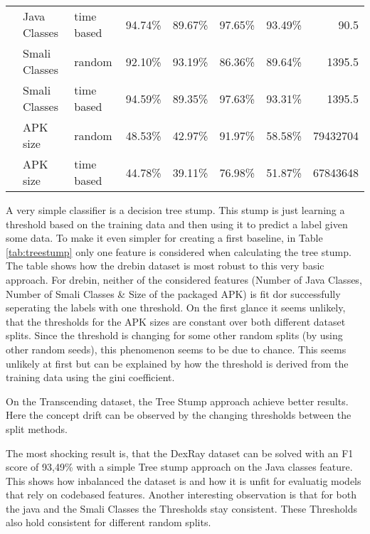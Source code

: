 \begin{table*}[t!]
{\begin{tabularx}{\linewidth}{@{}l l l r r r r r@{}}
                   & Java Classes & time based & 94.74\% & 89.67\% & 97.65\% & 93.49\% & 90.5 \\
                   & Smali Classes & random    & 92.10\% & 93.19\% & 86.36\% & 89.64\% & 1395.5 \\
                   & Smali Classes & time based & 94.59\% & 89.35\% & 97.63\% & 93.31\% & 1395.5 \\
                   & APK size     & random     & 48.53\% & 42.97\% & 91.97\% & 58.58\% & 79432704 \\
                   & APK size & time based & 44.78\% & 39.11\% & 76.98\% & 51.87\% & 67843648 \\
            \bottomrule
        \end{tabularx}
    }
\end{table*}

A very simple classifier is a decision tree stump.
This stump is just learning a threshold based on the training data and then using it to predict a label given some data.
To make it even simpler for creating a first baseline, in Table \ref{tab:treestump} only one feature is considered when calculating the tree stump.
The table shows how the drebin dataset is most robust to this very basic approach.
For drebin, neither of the considered features (Number of Java Classes, Number of Smali Classes \& Size of the packaged APK)
is fit dor successfully seperating the labels with one threshold.
On the first glance it seems unlikely, that the thresholds for the APK sizes are constant over both different dataset splits.
Since the threshold is changing for some other random splits (by using other random seeds),
this phenomenon seems to be due to chance.
This seems unlikely at first but can be explained by how the threshold is derived from the training data
using the gini coefficient.

On the Transcending dataset, the Tree Stump approach achieve better results.
Here the concept drift can be observed by the changing thresholds between the split methods.

The most shocking result is, that the DexRay dataset can be solved with an F1 score of 93,49\% 
with a simple Tree stump approach on the Java classes feature.
This shows how inbalanced the dataset is and how it is unfit for evaluatig models that rely on codebased features.
Another interesting observation is that for both the java and the Smali Classes the Thresholds stay consistent.
These Thresholds also hold consistent for different random splits.

